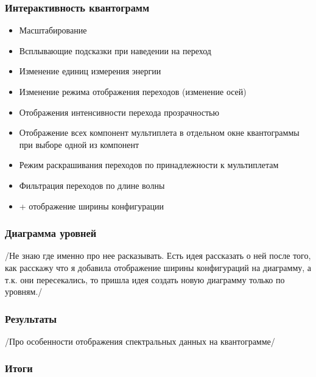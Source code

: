 \documentclass{beamer}
\begin{document}
\begin{frame}
\frametitle{Интерактивность квантограмм}
    \begin{itemize}
        \item Масштабирование
        \item Всплывающие подсказки при наведении на переход 
        \item Изменение единиц измерения энергии
        \item Изменение режима отображения переходов (изменение осей)
        \item Отображения интенсивности перехода прозрачностью
        \item Отображение всех компонент мультиплета в отдельном окне квантограммы при выборе одной из компонент
        \item Режим раскрашивания переходов по принадлежности к мультиплетам
        \item Фильтрация переходов по длине волны
        \item + отображение ширины конфигурации
    \end{itemize}
\end{frame}

\begin{frame}
\frametitle{Диаграмма уровней}
    /Не знаю где именно про нее расказывать. Есть идея рассказать о ней после того, как расскажу что я добавила отображение ширины конфигураций на диаграмму, а т.к. они пересекались, то пришла идея создать новую диаграмму только по уровням./
\end{frame}

\begin{frame}
\frametitle{Результаты }
    /Про особенности отображения спектральных данных на квантограмме/
\end{frame}

\begin{frame}
\frametitle{Итоги }
  
\end{frame}
\end{document}
